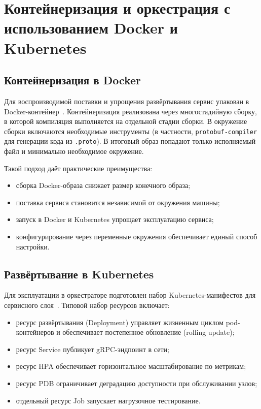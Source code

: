 \section{Контейнеризация и оркестрация с использованием Docker и Kubernetes}

\subsection{Контейнеризация в Docker}

Для воспроизводимой поставки и упрощения развёртывания сервис упакован в Docker-контейнер~\cite{docker_docs}.  
Контейнеризация реализована через многостадийную сборку, в которой компиляция выполняется на отдельной стадии сборки.  
В окружение сборки включаются необходимые инструменты (в частности, \texttt{protobuf-compiler} для генерации кода из \texttt{.proto}).  
В итоговый образ попадают только исполняемый файл и минимально необходимое окружение.  

Такой подход даёт практические преимущества:
\begin{itemize}
\item сборка Docker-образа снижает размер конечного образа;  
\item поставка сервиса становится независимой от окружения машины;  
\item запуск в Docker и Kubernetes упрощает эксплуатацию сервиса;  
\item конфигурирование через переменные окружения обеспечивает единый способ настройки.  
\end{itemize}

\subsection{Развёртывание в Kubernetes}

Для эксплуатации в оркестраторе подготовлен набор Kubernetes-манифестов для сервисного слоя~\cite{kubernetes_docs}.  
Типовой набор ресурсов включает:
\begin{itemize}
\item ресурс развёртывания (Deployment) управляет жизненным циклом pod-контейнеров и обеспечивает постепенное обновление (rolling update);  
\item ресурс Service публикует gRPC-эндпоинт в сети;  
\item ресурс HPA обеспечивает горизонтальное масштабирование по метрикам;  
\item ресурс PDB ограничивает деградацию доступности при обслуживании узлов;  
\item отдельный ресурс Job запускает нагрузочное тестирование.  
\end{itemize}

